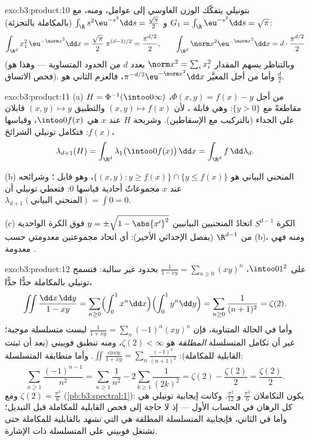 \begin{solution}{exo:b3:product:10}
بتونيلي يتفكّك الوزن الغاوسي إلى عوامل، ومنه، مع $G_1 =
\int_\R\eu^{-s^2}\dd s = \sqrt\pi$
و $\int_\R
s^2\eu^{-s^2}\dd s = \frac{\sqrt\pi}2$ (بالمكاملة بالتجزئة):
\[
\int_{\R^d}x_1^2\,\eu^{-\norm x^2}\dd x =
\frac{\sqrt\pi}2\;\pi^{(d-1)/2} = \frac{\pi^{d/2}}2,
\qquad
\int_{\R^d}\norm x^2\eu^{-\norm x^2}\dd x =
d\cdot\frac{\pi^{d/2}}2
\]
(وبالتناظر يسهم المقدار $\norm x^2 = \sum_ix_i^2$ بعدد $d$ من الحدود المتساوية ---
وهذا هو فحص الاتساق). وأما من أجل  المعيَّر
$\pi^{-d/2}\eu^{-\norm x^2}\dd x$، فالعزم الثاني هو
$\frac d2$.
\end{solution}

\begin{solution}{exo:b3:product:11}
(a) $H = \Phi^{-1}(\intoo0\infty)$ من أجل $\Phi(x, y) = f(x) -
y$، مقاطعةً مع $\{y > 0\}$: وهي قابلة
، لأن $(x, y)
\mapsto f(x)$ والتطبيق $(x,y)\mapsto y$ قابلان  على
الجداء (بالتركيب مع الإسقاطين). وشريحة $H$ عند $x$ هي
$\intoo0{f(x)}$، وقياسها $f(x)$: فتكامل تونيلي الشرائحَ،
\[
\lambda_{d+1}(H) = \int_{\R^d}\lambda_1\bigl(\intoo0{f(x)}
\bigr)\,\dd x = \int_{\R^d}f\,\dd\lambda_d .
\]

(b) المنحني البياني هو $\{(x,y) : y \geq f(x)\} \cap \{y \leq
f(x)\}$، وهو قابل ؛ وشرائحه عند
$x$ مجموعاتٌ أحادية قياسها $0$: فتعطي تونيلي أن $\lambda_{d+1}(\text{المنحني البياني}) =
\int 0 = 0$.

(c) الكرة $S^{d-1}$ اتحادُ المنحنيين البيانيين $y =
\pm\sqrt{1 - \abs{x'}^2}$ فوق الكرة
الواحدية من $\R^{d-1}$ (بفصل الإحداثي الأخير): أي اتحاد
مجموعتين معدومتي  حسب (b)، ومنه فهي معدومة .
\end{solution}

\begin{solution}{exo:b3:product:12}
على $\intoo01^2$، $\frac1{1 - xy} = \sum_{n\geq0}(xy)^n$ بحدود غير سالبة: فتسمح تونيلي
بالمكاملة حدًّا حدًّا،
\[
\iint\frac{\dd x\,\dd y}{1 - xy}
= \sum_{n\geq0}\Bigl(\int_0^1x^n\dd x\Bigr)
\Bigl(\int_0^1y^n\dd y\Bigr)
= \sum_{n\geq0}\frac1{(n+1)^2} = \zeta(2) .
\]
وأما في الحالة المتناوبة، فإن $\frac1{1 + xy} =
\sum_n(-1)^n(xy)^n$ ليست متسلسلة موجبة؛ غير أن
تكامل المتسلسلة \emph{المطلقة} هو $\zeta(2) <
\infty$، ومنه تنطبق فوبيني
(بعد أن ثبتت القابلية للمكاملة):
$\iint\frac{\dd x\dd y}{1 + xy} =
\sum_n\frac{(-1)^n}{(n+1)^2}$. وأما متطابقة المتسلسلة:
\[
\sum_{n\geq1}\frac{(-1)^{n-1}}{n^2}
= \sum_{n\geq1}\frac1{n^2} - 2\sum_{k\geq1}\frac1{(2k)^2}
= \zeta(2) - \frac{\zeta(2)}2 = \frac{\zeta(2)}2 .
\]
ومع $\zeta(2) = \frac{\pi^2}6$ (\cref{pb:b3:spectral:1}):
يكون التكاملان $\frac{\pi^2}6$ و $\frac{\pi^2}{12}$.
وكانت إيجابية تونيلي هي كل الرهان في الحساب الأول --- إذ لا
حاجة إلى فحص القابلية للمكاملة قبل التبديل؛ وأما في الثاني،
فإيجابية المتسلسلة المطلقة هي التي \emph{تشهد} بالقابلية
للمكاملة حتى تشتغل فوبيني على المتسلسلة ذات الإشارة.
\end{solution}

